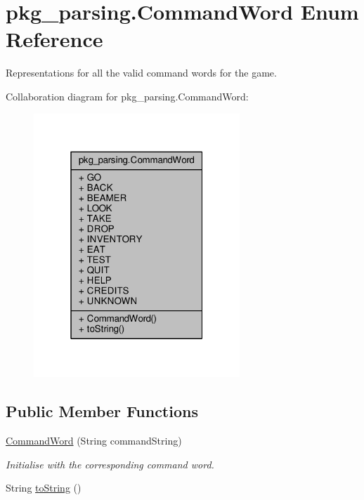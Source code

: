 \hypertarget{enumpkg__parsing_1_1CommandWord}{\section{pkg\-\_\-parsing.\-Command\-Word Enum Reference}
\label{enumpkg__parsing_1_1CommandWord}
}


Representations for all the valid command words for the game.  




Collaboration diagram for pkg\-\_\-parsing.\-Command\-Word\-:
\nopagebreak
\begin{figure}[H]
\begin{center}
\leavevmode
\includegraphics[width=220pt]{enumpkg__parsing_1_1CommandWord__coll__graph}
\end{center}
\end{figure}
\subsection*{Public Member Functions}
\begin{DoxyCompactItemize}
\item 
\hyperlink{enumpkg__parsing_1_1CommandWord_a7ff71159ae2c26835f5336580152d088}{Command\-Word} (String command\-String)
\begin{DoxyCompactList}\small\item\em Initialise with the corresponding command word. \end{DoxyCompactList}\item 
String \hyperlink{enumpkg__parsing_1_1CommandWord_ab6d70b61b7418ce7dfa930bda64132c5}{to\-String} ()
\end{DoxyCompactItemize}

